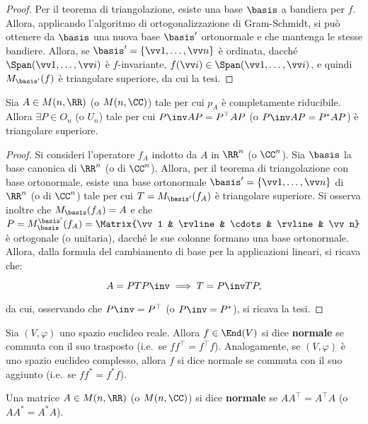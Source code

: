 \begin{proof}
	Per il teorema di triangolazione, esiste una base $\basis$ a bandiera per $f$. Allora,
	applicando l'algoritmo di ortogonalizzazione di Gram-Schmidt, si può ottenere da $\basis$
	una nuova base $\basis'$ ortonormale e che mantenga le stesse bandiere. Allora,
	se $\basis' = \{ \vv1, \ldots, \vv n \}$ è ordinata, dacché $\Span(\vv 1, \ldots, \vv i)$ è $f$-invariante,
	$f(\vv i) \in \Span(\vv 1, \ldots, \vv i)$, e quindi $M_{\basis'}(f)$ è triangolare superiore, da cui la tesi.
\end{proof}

\begin{corollary}
	Sia $A \in M(n, \RR)$ (o $M(n, \CC)$) tale per cui $p_A$ è completamente riducibile.
	Allora $\exists P \in O_n$ (o $U_n$) tale per cui
	$P\inv A P = P^\top A P$ (o $P\inv A P = P^* A P$) è triangolare superiore.
\end{corollary}

\begin{proof}
	Si consideri l'operatore $f_A$ indotto da $A$ in $\RR^n$ (o $\CC^n$). Sia $\basis$ la base canonica di $\RR^n$ (o di $\CC^n$). Allora, per il teorema
	di triangolazione con base ortonormale, esiste una base ortonormale $\basis' = \{ \vv1, \ldots, \vv n \}$ di $\RR^n$ (o di $\CC^n$)
	tale per cui $T = M_{\basis'}(f_A)$ è triangolare superiore. Si osserva inoltre che $M_{\basis}(f_A) = A$ e che $P = M_{\basis}^{\basis'} (f_A) = \Matrix{\vv 1 & \rvline & \cdots & \rvline & \vv n}$ è ortogonale (o unitaria), dacché le sue colonne
	formano una base ortonormale. Allora, dalla formula del cambiamento di base per la applicazioni lineari,
	si ricava che:
	
	\[ A = P T P\inv \implies T = P\inv T P, \]
	
	da cui, osservando che $P\inv = P^\top$ (o $P\inv = P^*$), si ricava la tesi.
\end{proof}

\begin{definition} 
	Sia $(V, \varphi)$ uno spazio euclideo reale. Allora $f \in \End(V)$ si dice \textbf{normale}
	se commuta con il suo trasposto (i.e.~se $f f^\top = f^\top f$). Analogamente,
	se $(V, \varphi)$ è uno spazio euclideo complesso, allora $f$ si dice normale se commuta con il suo
	aggiunto (i.e.~se $f f^* = f^* f$).
\end{definition}

\begin{definition} 
	Una matrice $A \in M(n, \RR)$ (o $M(n, \CC)$) si dice \textbf{normale} se $A A^\top = A^\top A$ (o $A A^* = A^* A$).
\end{definition}

